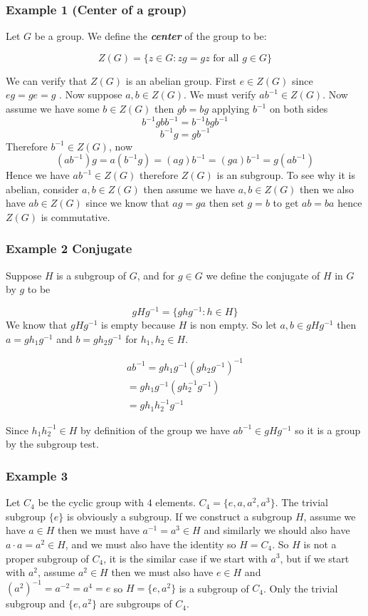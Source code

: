 \documentclass[16pt,a4paper]{article}
\theoremstyle{definition}
\begin{document}
\subsubsection*{Example 1 (Center of a group)} Let $G$ be a group. We define the \textit{\textbf{center}} of the group to be: 

\[Z(G) = \{z\in G : zg = gz \text{ for all $g\in G$}\}\]

We can verify that $Z(G)$ is an abelian group. First $e\in Z(G)$ since $eg = ge= g$ . Now suppose $a,b \in Z(G)$. We must verify $ab^{-1}\in Z(G)$. Now assume we have some $b\in Z(G)$ then $gb=bg$ applying $b^{-1}$ on both sides 
\[b^{-1}gbb^{-1} = b^{-1}bgb^{-1}\]
\[b^{-1}g = gb^{-1}\]
Therefore $b^{-1} \in Z(G)$, now 
\[(ab^{-1})g = a(b^{-1}g) = (ag)b^{-1} = (ga)b^{-1} = g(ab^{-1})\]
Hence we have $ab^{-1}\in Z(G)$ therefore $Z(G)$ is an subgroup. To see why it is abelian, consider $a,b\in Z(G)$ then assume we have $a,b \in Z(G)$ then we also have $ab\in Z(G)$ since we know that $ag=ga$ then set $g=b$ to get $ab=ba$ hence $Z(G)$ is commutative. 


\subsubsection*{Example 2 Conjugate}\label{cong}
Suppose $H$ is a subgroup of $G$, and for $g\in G$ we define the conjugate of $H$ in $G$ by $g$ to be

\[gHg^{-1} = \{ghg^{-1} : h \in H\}\]
We know that $gHg^{-1}$ is empty because $H$ is non empty. So let $a,b \in gHg^{-1}$ then $a=gh_1g^{-1}$ and $b=gh_2g^{-1}$ for $h_1, h_2 \in H$. 

\begin{align*}
ab^{-1} =gh_1g^{-1} (gh_2g^{-1})^{-1}\\
= gh_1g^{-1} (gh_2^{-1}g^{-1})\\
=gh_1h_2^{-1}g^{-1}
\end{align*}

Since $h_1h_2^{-1}\in H$ by definition of the group we have $ab^{-1}\in gHg^{-1}$ so it is a group by the subgroup test. 


\subsubsection*{Example 3}
Let $C_4$ be the cyclic group with $4$ elements. $C_4 = \{e,a,a^2, a^3\}$. The trivial subgroup $\{e\}$ is obviously a subgroup. If we construct a subgroup $H$, assume we have $a\in H$ then we must have $a^{-1}=a^3\in H$ and similarly we should also have $a\cdot a = a^2 \in H$, and we must also have the identity so $H=C_4$. So $H$ is not a proper subgroup of $C_4$, it is the similar case if we start with $a^3$, but if we start with $a^2$, assume $a^2 \in H$ then we must also have $e\in H$ and $(a^2)^{-1} = a^{-2}=a^4 = e$ so $H=\{e,a^2\}$ is a subgroup of $C_4$. Only the trivial subgroup and $\{e,a^2\}$ are subgroups of $C_4$. 
\newpage
\end{document}
